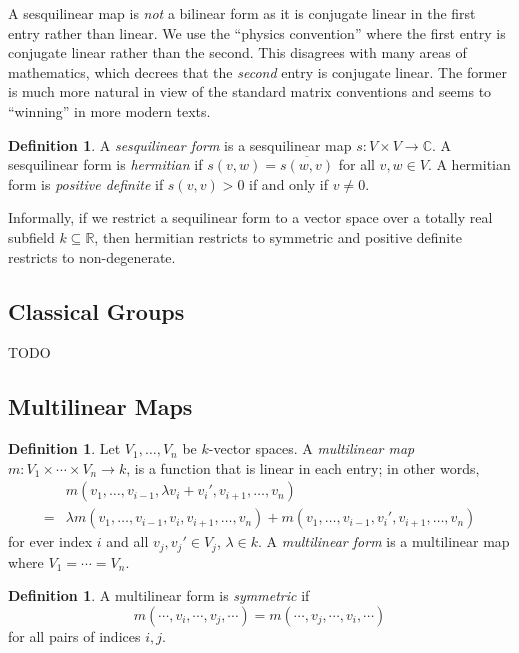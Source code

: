 \documentclass[12pt]{article}
\theoremstyle{plain}
\theoremstyle{definition}
\newtheorem{definition}[theorem]{Definition}
\theoremstyle{remark}
\numberwithin{equation}{section}
\begin{document}
A sesquilinear map is \emph{not} a bilinear form as it is conjugate
linear in the first entry rather than linear.
We use the ``physics convention'' where the first entry is conjugate
linear rather than the second.  This disagrees with many areas of
mathematics, which decrees that the \emph{second} entry is conjugate linear.
The former is much more natural in view of the standard matrix
conventions and seems to ``winning'' in more modern texts.

\begin{definition}
A \emph{sesquilinear form} is a sesquilinear map $s: V \times V \to
\mathbb{C}$.
A sesquilinear form is \emph{hermitian} if $s(v,w)=\overline{s(w,v)}$
for all $v,w \in V$.
A hermitian form is \emph{positive definite} if $s(v,v) > 0$ if and only
if $v \ne 0$.
\end{definition}

Informally, if we restrict a sequilinear form to a vector space over a totally real
subfield $k \subseteq \mathbb{R}$, then hermitian restricts to symmetric
and positive definite restricts to non-degenerate.

\subsection{Classical Groups}

TODO

\subsection{Multilinear Maps}

\begin{definition}
Let $V_1,\ldots, V_n$ be $k$-vector spaces.
A \emph{multilinear map} $m: V_1 \times \cdots \times V_n \to k$,
is a function that is linear in each entry; in other words,
\begin{align*}
&m(v_1,\ldots,v_{i-1},\lambda v_i + v_i',v_{i+1},\ldots,v_n)\\
=& \lambda m(v_1,\ldots,v_{i-1},v_i,v_{i+1},\ldots,v_n)
+ m(v_1,\ldots,v_{i-1},v_i',v_{i+1},\ldots,v_n)
\end{align*}
for ever index $i$ and all $v_j,v_j' \in V_j$, $\lambda \in k$.
A \emph{multilinear form} is a multilinear map where $V_1 = \cdots = V_n$.
\end{definition}

\begin{definition}
A multilinear form is
\emph{symmetric} if
\[
m(\cdots,v_i,\cdots,v_j,\cdots) = m(\cdots,v_j,\cdots,v_i,\cdots)
\]
for all pairs of indices $i,j$.
\end{definition}
\end{document}
